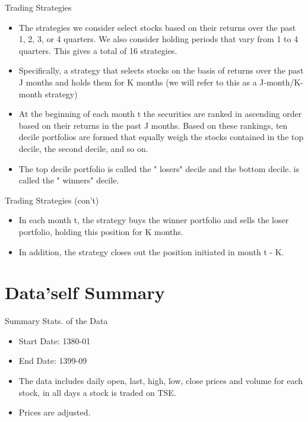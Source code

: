 \documentclass[aspectratio=169]{beamer}
\begin{document}
\begin{frame}{Trading Strategies}
	\begin{itemize}
		\item The strategies we consider select stocks based on their returns over the past 1, 2, 3, or 4 quarters. We also consider holding periods that vary from 1 to 4 quarters. This gives a total of 16 strategies.
		\item Specifically, a strategy that selects stocks on the basis of returns over the past J months and holds them for K months (we will refer to this as a J-month/K-month strategy)
		\item At the beginning of each month t the securities are ranked in ascending order based on their returns in the past J months. Based on these rankings, ten decile portfolios are formed that equally weigh the stocks contained in the top decile, the second decile, and so on.
		\item The top decile portfolio is called the " losers" decile and the bottom decile. is called the " winners" decile.
	\end{itemize}
\end{frame}

\begin{frame}{Trading Strategies (con't)}
	\begin{itemize}
		\item In each month t, the strategy buys the winner portfolio and sells the loser portfolio, holding this position for K months.
		\item In addition, the strategy closes out the position initiated in month t - K.
	\end{itemize}
\end{frame}


\section{Data'self Summary}


\begin{frame}{Summary Stats. of the Data}
	\begin{itemize}
		\item Start Date: 1380-01
		\item End Date: 1399-09
		\item The data includes daily open, last, high, low, close prices and volume for each stock, in all days a stock is traded on TSE.
		\item Prices are adjusted.
	\end{itemize}
\end{frame}
\end{document}
